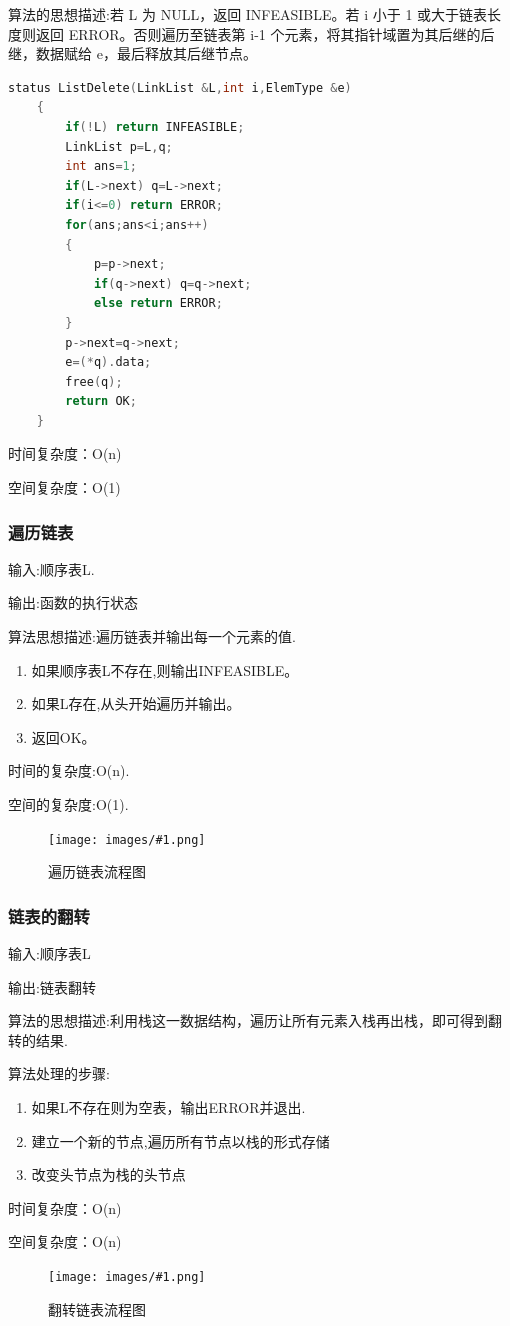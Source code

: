 \documentclass[supercite]{Experimental_Report}
\newcommand{\cfig}[3]{
	\begin{figure}[htb]
		\centering
		\texttt{[image: images/\#1.png]}
		\caption{#3}
		\label{fig:#1}
	\end{figure}
}
\theoremstyle{definition}
\begin{document}
算法的思想描述:若 L 为 NULL，返回 INFEASIBLE。若 i 小于 1 或大于链表长度则返回 ERROR。否则遍历至链表第 i-1 个元素，将其指针域置为其后继的后继，数据赋给 e，最后释放其后继节点。
\begin{lstlisting}[language=C] 
	status ListDelete(LinkList &L,int i,ElemType &e)
	{
		if(!L) return INFEASIBLE;
		LinkList p=L,q;
		int ans=1;
		if(L->next) q=L->next;
		if(i<=0) return ERROR;
		for(ans;ans<i;ans++)
		{  
			p=p->next;
			if(q->next) q=q->next;
			else return ERROR;
		}
		p->next=q->next;
		e=(*q).data;
		free(q);
		return OK;
	}
\end{lstlisting}

时间复杂度：O(n)

空间复杂度：O(1)
\subsubsection{遍历链表}
输入:顺序表L.

输出:函数的执行状态

算法思想描述:遍历链表并输出每一个元素的值.
\begin{enumerate}
	\renewcommand{\labelenumi}{\theenumi)}
	\item 如果顺序表L不存在,则输出INFEASIBLE。
	\item 如果L存在,从头开始遍历并输出。
	\item 返回OK。
\end{enumerate}

时间的复杂度:O(n).

空间的复杂度:O(1).
\cfig{1.2.7}{0.8}{遍历链表流程图}
\newpage 
\subsubsection{链表的翻转} 

输入:顺序表L

输出:链表翻转

算法的思想描述:利用栈这一数据结构，遍历让所有元素入栈再出栈，即可得到翻转的结果.

算法处理的步骤:
\begin{enumerate}
	\renewcommand{\labelenumi}{\theenumi)}
	\item 如果L不存在则为空表，输出ERROR并退出.
	\item 建立一个新的节点,遍历所有节点以栈的形式存储
	\item 改变头节点为栈的头节点
\end{enumerate}

时间复杂度：O(n)

空间复杂度：O(n)
\cfig{1.2.8}{0.5}{翻转链表流程图}
\end{document}
